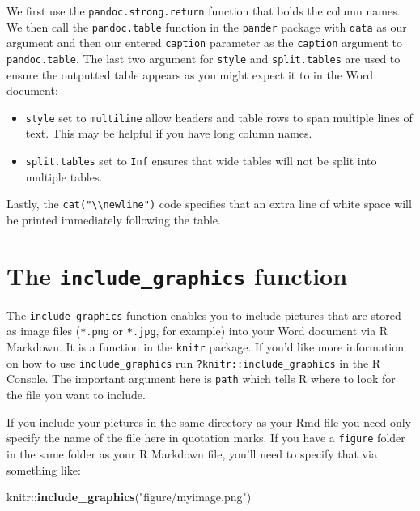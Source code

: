 \documentclass[]{tufte-book}
\newenvironment{Shaded}{\begin{snugshade}}{\end{snugshade}}
\newcommand{\KeywordTok}[1]{\textcolor[rgb]{0.13,0.29,0.53}{\textbf{{#1}}}}
\newcommand{\StringTok}[1]{\textcolor[rgb]{0.31,0.60,0.02}{{#1}}}
\newcommand{\NormalTok}[1]{{#1}}
\begin{document}
We first use the \texttt{pandoc.strong.return} function that bolds the
column names. We then call the \texttt{pandoc.table} function in the
\texttt{pander} package with \texttt{data} as our argument and then our
entered \texttt{caption} parameter as the \texttt{caption} argument to
\texttt{pandoc.table}. The last two argument for \texttt{style} and
\texttt{split.tables} are used to ensure the outputted table appears as
you might expect it to in the Word document:

\begin{itemize}
\item
  \texttt{style} set to \texttt{multiline} allow headers and table rows
  to span multiple lines of text. This may be helpful if you have long
  column names.
\item
  \texttt{split.tables} set to \texttt{Inf} ensures that wide tables
  will not be split into multiple tables.
\end{itemize}

Lastly, the \texttt{cat("\textbackslash{}\textbackslash{}newline")} code
specifies that an extra line of white space will be printed immediately
following the table.

\section{\texorpdfstring{The \texttt{include\_graphics}
function}{The include\_graphics function}}\label{the-includeux5fgraphics-function}

The \texttt{include\_graphics} function enables you to include pictures
that are stored as image files (\texttt{*.png} or \texttt{*.jpg}, for
example) into your Word document via R Markdown. It is a function in the
\texttt{knitr} package. If you'd like more information on how to use
\texttt{include\_graphics} run \texttt{?knitr::include\_graphics} in the
R Console. The important argument here is \texttt{path} which tells R
where to look for the file you want to include.

If you include your pictures in the same directory as your Rmd file you
need only specify the name of the file here in quotation marks. If you
have a \texttt{figure} folder in the same folder as your R Markdown
file, you'll need to specify that via something like:

\begin{Shaded}
\begin{Highlighting}[]
\NormalTok{knitr::}\KeywordTok{include_graphics}\NormalTok{(}\StringTok{"figure/myimage.png"}\NormalTok{)}
\end{Highlighting}
\end{Shaded}
\end{document}
